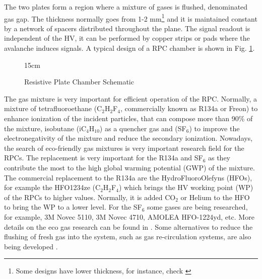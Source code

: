 The two plates form a region where a mixture of gases is flushed, denominated gas gap. The thickness normally goes from 1-2 mm\footnote{Some designs have lower thickness, for instance, check \cite{Deppner:2016yku}} and it is maintained constant by a network of spacers distributed throughout the plane. The signal readout is independent of the HV, it can be performed by copper strips or pads where the avalanche induces signals. A typical design of a RPC chamber is shown in Fig. \ref{fig:RPC_schematic}.

\begin{figure}[!htm]{15cm}
\caption{Resistive Plate Chamber Schematic}%
\label{fig:RPC_schematic}
\end{figure}

The gas mixture is very important for efficient operation of the RPC. Normally, a mixture of tetraﬂuoroethane (C$_2$H$_2$F$_4$, commercially known as R134a or Freon) to enhance ionization of the incident particles, that can compose more than 90\% of the mixture, isobutane (iC$_4$H$_10$) as a quencher gas and (SF$_6$) to improve the electronegativity of the mixture and reduce the secondary ionization. Nowadays, the search of eco-friendly gas mixtures is very important research field for the RPCs. The replacement is very important for the R134a and SF$_6$ as they contribute the most to the high global warming potential (GWP) of the mixture. The commercial replacement to the R134a are the HydroFluoroOlefyns (HFOs), for example the HFO1234ze (C$_2$H$_2$F$_4$) which brings the HV working point (WP) of the RPCs to higher values. Normally, it is added CO$_2$ or Helium to the HFO to bring the WP to a lower level. For the SF$_6$ some gases are being researched, for example, 3M Novec 5110, 3M Novec 4710, AMOLEA HFO-1224yd, etc. More details on the eco gas research can be found in \cite{Guida:2022pyg}. Some alternatives to reduce the flushing of fresh gas into the system, such as gas re-circulation systems, are also being developed \cite{Corbetta:2020esl}.

